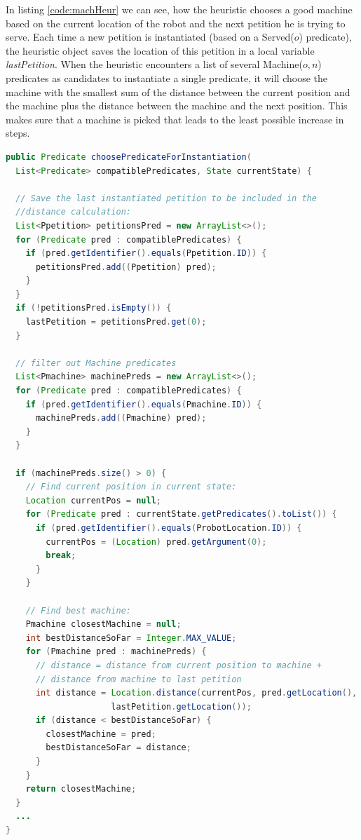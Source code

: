 In listing \ref{code:machHeur} we can see, how the heuristic chooses a good machine based on the current location of the robot and the next petition he is trying to serve. Each time a new petition is instantiated (based on a Served($o$) predicate), the heuristic object saves the location of this petition in a local variable \textit{lastPetition}. When the heuristic encounters a list of several Machine($o, n$) predicates as candidates to instantiate a single predicate, it will choose the machine with the smallest sum of the distance between the current position and the machine plus the distance between the machine and the next position. This makes sure that a machine is picked that leads to the least possible increase in steps.
\begin{lstlisting}[language=Java, 
	caption=CoffeeHeuristic method  \textit{choosePredicateForInstantiation}, 
	keywordstyle=\color{blue},
	stringstyle=\color{red},
	commentstyle=\color{magenta},
	label = {code:machHeur}]
public Predicate choosePredicateForInstantiation(
  List<Predicate> compatiblePredicates, State currentState) {

  // Save the last instantiated petition to be included in the 
  //distance calculation:
  List<Ppetition> petitionsPred = new ArrayList<>();
  for (Predicate pred : compatiblePredicates) {
    if (pred.getIdentifier().equals(Ppetition.ID)) {
      petitionsPred.add((Ppetition) pred);
    }
  }
  if (!petitionsPred.isEmpty()) {
    lastPetition = petitionsPred.get(0);
  }
  
  // filter out Machine predicates
  List<Pmachine> machinePreds = new ArrayList<>();
  for (Predicate pred : compatiblePredicates) {
    if (pred.getIdentifier().equals(Pmachine.ID)) {
      machinePreds.add((Pmachine) pred);
    }
  }
  
  if (machinePreds.size() > 0) {
    // Find current position in current state:
    Location currentPos = null;
    for (Predicate pred : currentState.getPredicates().toList()) {
      if (pred.getIdentifier().equals(ProbotLocation.ID)) {
        currentPos = (Location) pred.getArgument(0);
        break;
      }
    }
    
    // Find best machine:
    Pmachine closestMachine = null;
    int bestDistanceSoFar = Integer.MAX_VALUE;
    for (Pmachine pred : machinePreds) {
      // distance = distance from current position to machine +
      // distance from machine to last petition
      int distance = Location.distance(currentPos, pred.getLocation(), 
                     lastPetition.getLocation());
	  if (distance < bestDistanceSoFar) {
	    closestMachine = pred;
	    bestDistanceSoFar = distance;
	  }
    }
    return closestMachine;
  }
  ...
}
\end{lstlisting}








